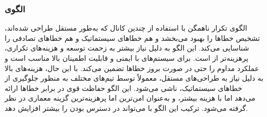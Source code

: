 \subsubsection{الگوی }
\label{archSafeHeteroRedundancySec}
\begin{RTL}
الگوی تکرار ناهمگن \cite{ref4}
با استفاده از چندین کانال که به‌طور مستقل طراحی شده‌اند،
تشخیص خطاها را بهبود می‌بخشد و هم خطاهای سیستماتیک و
هم خطاهای تصادفی را شناسایی می‌کند. این الگو به دلیل نیاز بیشتر به زحمت
توسعه و هزینه‌های تکراری، پرهزینه‌تر از
 است. برای
سیستم‌های با ایمنی و قابلیت اطمینان بالا مناسب است
و عملکرد مداوم را حتی در صورت بروز خطاها تضمین می‌کند. با این حال،
هزینه‌های بالا به دلیل نیاز به طراحی‌های مستقل، معمولاً توسط تیم‌های مختلف
به منظور جلوگیری از خطاهای سیستماتیک، ناشی می‌شود. این الگو حفاظت
قوی در برابر خطاها ارائه می‌دهد اما با هزینه بیشتر، و به‌عنوان امن‌ترین اما
پرهزینه‌ترین گزینه معماری در نظر گرفته می‌شود.
ترکیب این الگو با  می‌تواند
در دسترس بودن را بیشتر افزایش دهد.
\end{RTL}